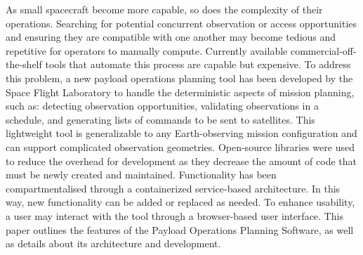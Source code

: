 \doublespacing 

As small spacecraft become more capable, so does the complexity of their
operations. Searching for potential concurrent observation or access
opportunities and ensuring they are compatible with one another may become
tedious and repetitive for operators to manually compute. Currently available
commercial-off-the-shelf tools that automate this process are capable but
expensive. To address this problem, a new payload operations planning tool has
been developed by the Space Flight Laboratory to handle the deterministic
aspects of mission planning, such as: detecting observation opportunities,
validating observations in a schedule, and generating lists of commands to be
sent to satellites. This lightweight tool is generalizable to any
Earth-observing mission configuration and can support complicated observation
geometries. Open-source libraries were used to reduce the overhead for
development as they decrease the amount of code that must be newly created and
maintained. Functionality has been compartmentalised through a containerized
service-based architecture. In this way, new functionality can be added or
replaced as needed. To enhance usability, a user may interact with the tool
through a browser-based user interface. This paper outlines the features of the
Payload Operations Planning Software, as well as details about its architecture
and development.

\doublespacing

